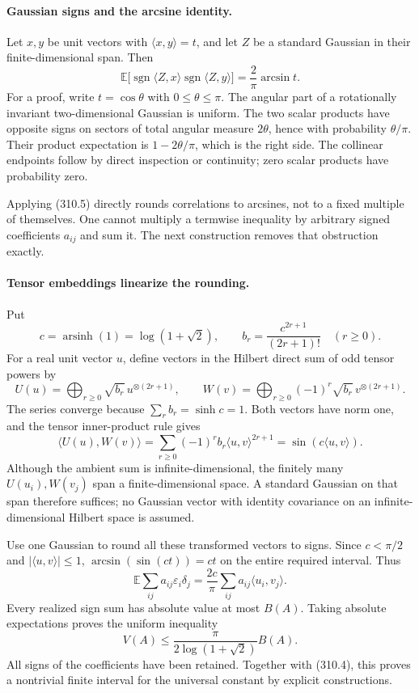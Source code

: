 \documentclass[11pt]{article}
\begin{document}
\paragraph{Gaussian signs and the arcsine identity.}
Let $x,y$ be unit vectors with $\langle x,y\rangle=t$, and let
$Z$ be a standard Gaussian in their finite-dimensional span. Then
\[
 \mathbb E\bigl[\operatorname{sgn}\langle Z,x\rangle
                 \operatorname{sgn}\langle Z,y\rangle\bigr]
       =\frac2\pi\arcsin t.
 \tag{310.5}
\]
For a proof, write $t=\cos\theta$ with $0\leq\theta\leq\pi$.
The angular part of a rotationally invariant two-dimensional
Gaussian is uniform. The two scalar products have opposite signs
on sectors of total angular measure $2\theta$, hence with probability
$\theta/\pi$. Their product expectation is $1-2\theta/\pi$,
which is the right side. The collinear endpoints follow by direct
inspection or continuity; zero scalar products have probability zero.

Applying (310.5) directly rounds correlations to arcsines, not to
a fixed multiple of themselves. One cannot multiply a termwise
inequality by arbitrary signed coefficients $a_{ij}$ and sum it.
The next construction removes that obstruction exactly.

\paragraph{Tensor embeddings linearize the rounding.}
Put
\[
 c=\operatorname{arsinh}(1)=\log(1+\sqrt2),\qquad
 b_r=\frac{c^{2r+1}}{(2r+1)!}\quad(r\geq0).
\]
For a real unit vector $u$, define vectors in the Hilbert direct sum
of odd tensor powers by
\[
 U(u)=\bigoplus_{r\geq0}\sqrt{b_r}\,u^{\otimes(2r+1)},
 \qquad
 W(v)=\bigoplus_{r\geq0}(-1)^r\sqrt{b_r}\,
                                      v^{\otimes(2r+1)}.
 \tag{310.6}
\]
The series converge because $\sum_rb_r=\sinh c=1$.
Both vectors have norm one, and the tensor inner-product rule gives
\[
 \langle U(u),W(v)\rangle
 =\sum_{r\geq0}(-1)^rb_r\langle u,v\rangle^{2r+1}
 =\sin(c\langle u,v\rangle).
 \tag{310.7}
\]
Although the ambient sum is infinite-dimensional, the finitely many
$U(u_i),W(v_j)$ span a finite-dimensional space. A standard Gaussian
on that span therefore suffices; no Gaussian vector with identity
covariance on an infinite-dimensional Hilbert space is assumed.

Use one Gaussian to round all these transformed vectors to signs.
Since $c<\pi/2$ and $|\langle u,v\rangle|\leq1$,
$\arcsin(\sin(ct))=ct$ on the entire required interval. Thus
\[
 \mathbb E\sum_{ij}a_{ij}\varepsilon_i\delta_j
       =\frac{2c}{\pi}\sum_{ij}a_{ij}\langle u_i,v_j\rangle.
\]
Every realized sign sum has absolute value at most $B(A)$.
Taking absolute expectations proves the uniform inequality
\[
 V(A)\leq\frac{\pi}{2\log(1+\sqrt2)}B(A).
 \tag{310.8}
\]
All signs of the coefficients have been retained. Together with
(310.4), this proves a nontrivial finite interval for the universal
constant by explicit constructions.
\end{document}

